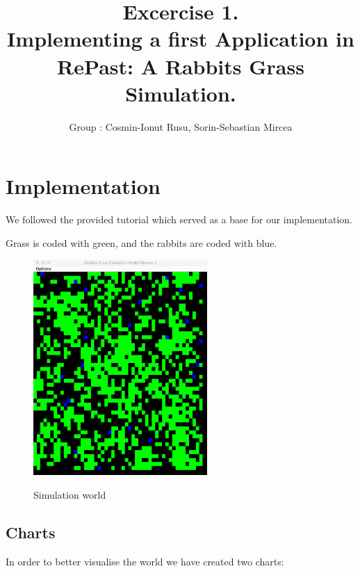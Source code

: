 \documentclass[11pt]{article}
\title{\bf Excercise 1.\\ Implementing a first Application in RePast: A Rabbits Grass Simulation.}
\author{Group \textnumero 10: Cosmin-Ionut Rusu, Sorin-Sebastian Mircea}
\begin{document}
\maketitle

\section{Implementation}
We followed the provided tutorial which served as a base for our implementation.

Grass is coded with green, and the rabbits are coded with blue.
\begin{figure}[H]
\includegraphics[width=0.59\textwidth]{world}
\centering
\label{fig:world}
\caption{Simulation world }
\end{figure}


\subsection*{Charts}
In order to better visualise the world we have created two charts:
\end{document}
